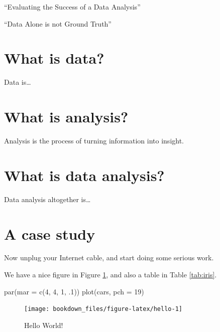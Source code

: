 \documentclass[
]{krantz}
\makeatletter
\newenvironment{Shaded}{\begin{snugshade}}{\end{snugshade}}
\newcommand{\AttributeTok}[1]{\textcolor[rgb]{0.61,0.61,0.61}{#1}}
\newcommand{\DecValTok}[1]{\textcolor[rgb]{0.06,0.06,0.06}{#1}}
\newcommand{\FunctionTok}[1]{\textcolor[rgb]{0,0,0}{#1}}
\newcommand{\NormalTok}[1]{#1}
\newenvironment{kframe}{%
\medskip{}
\setlength{\fboxsep}{.8em}
 \def\at@end@of@kframe{}%
 \ifinner\ifhmode%
  \def\at@end@of@kframe{\end{minipage}}%
  \begin{minipage}{\columnwidth}%
 \fi\fi%
 \def\FrameCommand##1{\hskip\@totalleftmargin \hskip-\fboxsep
 \colorbox{shadecolor}{##1}\hskip-\fboxsep
     \hskip-\linewidth \hskip-\@totalleftmargin \hskip\columnwidth}%
 \MakeFramed {\advance\hsize-\width
   \@totalleftmargin\z@ \linewidth\hsize
   \@setminipage}}%
 {\par\unskip\endMakeFramed%
 \at@end@of@kframe}
\renewenvironment{Shaded}{\begin{kframe}}{\end{kframe}}
\makeatother
\begin{document}
``Evaluating the Success of a Data Analysis'' \citep{hicks2019evaluating}

``Data Alone is not Ground Truth'' \citep{bassa_2017}

\hypertarget{what-is-data}{%
\section{What is data?}\label{what-is-data}}

Data is\ldots{}

\hypertarget{what-is-analysis}{%
\section{What is analysis?}\label{what-is-analysis}}

Analysis is the process of turning information into insight.

\hypertarget{what-is-data-analysis}{%
\section{What is data analysis?}\label{what-is-data-analysis}}

Data analysis altogether is\ldots{}

\hypertarget{a-case-study}{%
\section{A case study}\label{a-case-study}}

Now unplug your Internet cable, and start doing some serious work.

We have a nice figure in Figure \ref{fig:hello}, and also a table in Table \ref{tab:iris}.

\begin{Shaded}
\begin{Highlighting}[]
\FunctionTok{par}\NormalTok{(}\AttributeTok{mar =} \FunctionTok{c}\NormalTok{(}\DecValTok{4}\NormalTok{, }\DecValTok{4}\NormalTok{, }\DecValTok{1}\NormalTok{, .}\DecValTok{1}\NormalTok{))}
\FunctionTok{plot}\NormalTok{(cars, }\AttributeTok{pch =} \DecValTok{19}\NormalTok{)}
\end{Highlighting}
\end{Shaded}

\begin{figure}
\texttt{[image: bookdown\_files/figure-latex/hello-1]} \caption{Hello World!}\label{fig:hello}
\end{figure}
\end{document}
